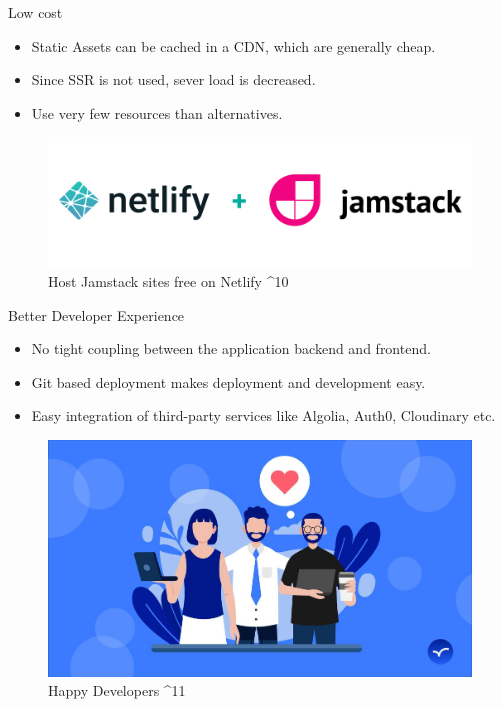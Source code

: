 \documentclass[aspectratio=169,9pt]{beamer}
\begin{document}
\begin{frame}{Low cost}
    \vspace{2em}
    \begin{itemize}
        \item Static Assets can be cached in a CDN, which are generally cheap.
        \item Since SSR is not used, sever load is decreased.
        \item Use very few resources than alternatives.
    \end{itemize}
    \vfill
    \begin{figure}
        \includegraphics[scale=.2]{images/netlify.png}
        \caption{Host Jamstack sites free on Netlify ^{10}}
    \end{figure}
    
\end{frame}

\begin{frame}{Better Developer Experience}
    \vspace{2em}
    \begin{itemize}
        \item No tight coupling between the application backend and frontend.
        \item Git based deployment makes deployment and development easy.
        \item Easy integration of third-party services like Algolia, Auth0, Cloudinary etc.
    \end{itemize}
    \vfill
    \begin{figure}
        \includegraphics[scale=.13]{images/happy-developer.png}
        \caption{Happy Developers ^{11}}
    \end{figure}
    
\end{frame}
\end{document}

